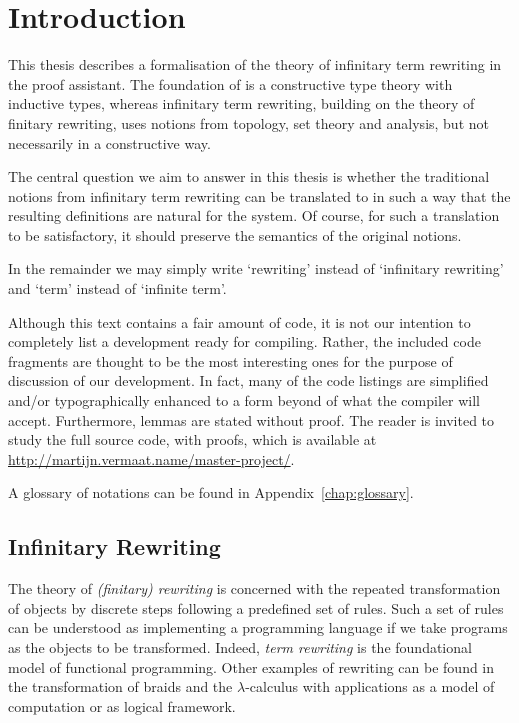 \chapter{Introduction}
\setcounter{page}{1}

This thesis describes a formalisation of the theory of infinitary term
rewriting in the \Coq proof assistant. The foundation of \Coq is a
constructive type theory with inductive types, whereas infinitary term
rewriting, building on the theory of finitary rewriting, uses notions
from topology, set theory and analysis, but not necessarily in a
constructive way.

The central question we aim to answer in this thesis is whether the
traditional notions from infinitary term rewriting can be translated
to \Coq in such a way that the resulting definitions are natural for
the \Coq system. Of course, for such a translation to be satisfactory,
it should preserve the semantics of the original notions.


In the remainder we may simply write `rewriting' instead of
`infinitary rewriting' and `term' instead of `infinite
term'.

Although this text contains a fair amount of \Coq code, it is not our
intention to completely list a development ready for compiling. Rather, the
included code fragments are thought to be the most interesting ones for the
purpose of discussion of our development. In fact, many of the code listings
are simplified and/or typographically enhanced to a form beyond of what the
\Coq compiler will accept. Furthermore, lemmas are stated without proof. The
reader is invited to study the full source code, with proofs, which is
available at \url{http://martijn.vermaat.name/master-project/}.

A glossary of notations can be found in Appendix~\ref{chap:glossary}.


\section*{Infinitary Rewriting}

The theory of \emph{(finitary) rewriting} is concerned with the
repeated transformation of objects by discrete steps following a
predefined set of rules. Such a set of rules can be understood as
implementing a programming language if we take programs as the objects
to be transformed. Indeed, \emph{term rewriting} is the foundational
model of functional programming. Other examples of rewriting can be
found in the transformation of braids and the $\lambda$-calculus
with applications as a model of computation or as logical framework.

